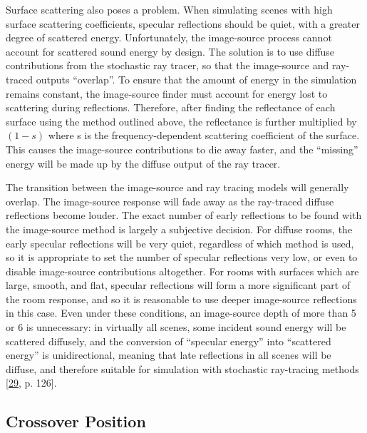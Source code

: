\documentclass[]{scrreprt}
\begin{document}
Surface scattering also poses a problem. When simulating scenes with
high surface scattering coefficients, specular reflections should be
quiet, with a greater degree of scattered energy. Unfortunately, the
image-source process cannot account for scattered sound energy by
design. The solution is to use diffuse contributions from the stochastic
ray tracer, so that the image-source and ray-traced outputs ``overlap''.
To ensure that the amount of energy in the simulation remains constant,
the image-source finder must account for energy lost to scattering
during reflections. Therefore, after finding the reflectance of each
surface using the method outlined above, the reflectance is further
multiplied by \((1 - s)\) where s is the frequency-dependent scattering
coefficient of the surface. This causes the image-source contributions
to die away faster, and the ``missing'' energy will be made up by the
diffuse output of the ray tracer.

The transition between the image-source and ray tracing models will
generally overlap. The image-source response will fade away as the
ray-traced diffuse reflections become louder. The exact number of early
reflections to be found with the image-source method is largely a
subjective decision. For diffuse rooms, the early specular reflections
will be very quiet, regardless of which method is used, so it is
appropriate to set the number of specular reflections very low, or even
to disable image-source contributions altogether. For rooms with
surfaces which are large, smooth, and flat, specular reflections will
form a more significant part of the room response, and so it is
reasonable to use deeper image-source reflections in this case. Even
under these conditions, an image-source depth of more than 5 or 6 is
unnecessary: in virtually all scenes, some incident sound energy will be
scattered diffusely, and the conversion of ``specular energy'' into
``scattered energy'' is unidirectional, meaning that late reflections in
all scenes will be diffuse, and therefore suitable for simulation with
stochastic ray-tracing methods
{[}\protect\hyperlink{ref-kuttruffux5froomux5f2009}{29}, p. 126{]}.

\subsection{Crossover Position}\label{crossover-position}
\end{document}
